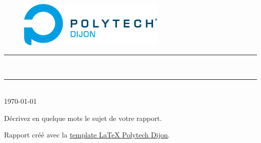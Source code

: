 \thispagestyle{empty} %
\setcounter{page}{0} %

\begin{figure}[H]
\centering
\includegraphics[width=7cm]{./Graphismes-Polytech-Dijon/logos/logo-couleur.png}
\end{figure}

\vspace{3cm}

\begin{center}

{\color{bleufPolytechDijon}\rule{\linewidth}{0.8mm}}
\vspace*{0mm}

\Huge{\textbf{\theUV \\ \thetitle}}
{\color{bleufPolytechDijon}\rule{\linewidth}{0.8mm}}

\vspace{0.5cm}
\Large{\theauthor} \\
\vspace{0.5cm}
\Large{\today}
\end{center}
 
\vspace{3cm}

\begin{myabstract}
Décrivez en quelque mots le sujet de votre rapport. \\
\end{myabstract}

\begin{credits}
Rapport créé avec la \underline{\href{https://github.com/polytech-dijon/template-latex}{template LaTeX Polytech Dijon}}.
\end{credits}

\clearpage